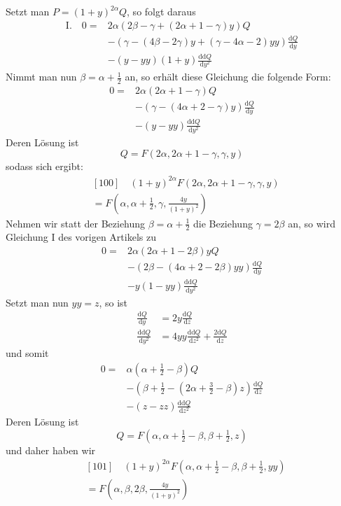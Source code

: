 Setzt man $P=(1+y)^{2\alpha}Q$, so folgt daraus
\[
\begin{aligned}
\mathrm I.\quad 0={}&2\alpha(2\beta-\gamma+(2\alpha+1-\gamma)y)Q\\
&-(\gamma-(4\beta-2\gamma)y+(\gamma-4\alpha-2)yy)\frac{\mathrm dQ}{\mathrm dy}\\
&-(y-yy)(1+y)\frac{\mathrm{dd}Q}{\mathrm dy^2}
\end{aligned}
\]
Nimmt man nun $\beta=\alpha+\frac12$ an, so erhält diese Gleichung die folgende Form:
\[
\begin{aligned}
0={}&2\alpha(2\alpha+1-\gamma)Q\\
&-(\gamma-(4\alpha+2-\gamma)y)\frac{\mathrm dQ}{\mathrm dy}\\
&-(y-yy)\frac{\mathrm{dd}Q}{\mathrm dy^2}
\end{aligned}
\]
Deren Lösung ist
\[
Q=F(2\alpha,2\alpha+1-\gamma,\gamma,y)
\]
sodass sich ergibt:
\[
\begin{aligned}&[100]\quad(1+y)^{2\alpha}F(2\alpha,2\alpha+1-\gamma,\gamma,y)\\&=F(\alpha,\alpha+\tfrac12,\gamma,\tfrac{4y}{(1+y)^2})\end{aligned}
\]
Nehmen wir statt der Beziehung $\beta=\alpha+\frac12$ die Beziehung $\gamma=2\beta$ an, so wird Gleichung I des vorigen Artikels zu
\[
\begin{aligned}
0={}&2\alpha(2\alpha+1-2\beta)yQ\\
&-(2\beta-(4\alpha+2-2\beta)yy)\frac{\mathrm dQ}{\mathrm dy}\\
&-y(1-yy)\frac{\mathrm{dd}Q}{\mathrm dy^2}
\end{aligned}
\]
Setzt man nun $yy=z$, so ist
\[
\begin{aligned}
\frac{\mathrm dQ}{\mathrm dy}&=2y\frac{\mathrm dQ}{\mathrm dz}\\
\frac{\mathrm{dd}Q}{\mathrm dy^2}&=4yy\frac{\mathrm{dd}Q}{\mathrm dz^2}+\frac{2\mathrm dQ}{\mathrm dz}
\end{aligned}
\]
und somit
\[
\begin{aligned}
0={}&\alpha(\alpha+\tfrac12-\beta)Q\\
&-(\beta+\tfrac12-(2\alpha+\tfrac32-\beta)z)\frac{\mathrm dQ}{\mathrm dz}\\
&-(z-zz)\frac{\mathrm{dd}Q}{\mathrm dz^2}
\end{aligned}
\]
Deren Lösung ist
\[
Q=F(\alpha,\alpha+\tfrac12-\beta,\beta+\tfrac12,z)
\]
und daher haben wir
\[
\begin{aligned}&[101]\quad(1+y)^{2\alpha}F(\alpha,\alpha+\tfrac12-\beta,\beta+\tfrac12,yy)\\&=F(\alpha,\beta,2\beta,\tfrac{4y}{(1+y)^2})\end{aligned}
\]
